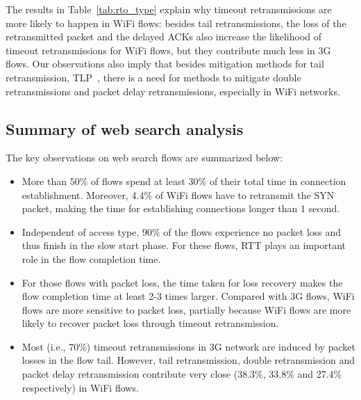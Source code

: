 The results in Table~\ref{tab:rto_type} explain why timeout retransmissions are more likely to happen in WiFi flows: besides tail retransmissions, the loss of the retransmitted packet and the delayed ACKs also increase the likelihood of timeout retransmissions for WiFi flows, but they contribute much less in 3G flows. Our observations also imply that besides mitigation methods for tail retransmission, \eg TLP~\cite{flach2013reducing}, there is a need for methods to mitigate double retransmissions and packet delay retransmissions, especially in WiFi networks.

\subsection{Summary of web search analysis}

The key observations on web search flows are summarized below:

\begin{itemize}

\item More than 50\% of flows spend at least 30\% of their total time in connection establishment. Moreover, 4.4\% of WiFi flows have to retransmit the SYN packet, making the time for establishing connections longer than 1 second.
	
\item Independent of access type, 90\% of the flows experience no packet loss and thus finish in the slow start phase. For these flows,  RTT plays an important role in the flow completion time. %
	
\item For those flows with packet loss, the time taken for loss recovery makes the flow completion time at least 2-3 times larger. Compared with 3G flows, WiFi flows are more sensitive to packet loss, partially because WiFi flows are more likely to recover packet loss through timeout retransmission. 
	
\item Most (i.e., 70\%) timeout retransmissions in 3G network are induced by packet losses in the flow tail. However, tail retransmission, double retransmission and packet delay retransmission contribute very close (38.3\%, 33.8\% and 27.4\% respectively) in WiFi flows. 
	
\end{itemize}